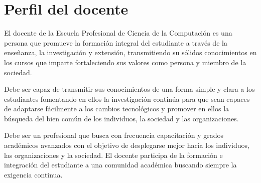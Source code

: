 \section{Perfil del docente}
El docente de la Escuela Profesional de Ciencia de la Computación es una persona 
que promueve la formación integral del estudiante a través de la enseñanza,
la investigación y extensión, transmitiendo su sólidos conocimientos en los cursos que imparte
fortaleciendo sus valores como persona y miembro de la sociedad.

Debe ser capaz de transmitir sus conocimientos de una forma simple y clara a los estudiantes
fomentando en ellos la investigación continúa para que sean capaces de adaptarse fácilmente a los
cambios tecnológicos y promover en ellos la búsqueda del bien común de los individuos, la sociedad y
las organizaciones.

Debe ser un profesional que busca con frecuencia capacitación y grados académicos avanzados con
el objetivo de desplegarse mejor hacia los individuos, las organizaciones y la sociedad.
El docente participa de la formación e integración del estudiante a una comunidad académica
 buscando siempre la exigencia continua.